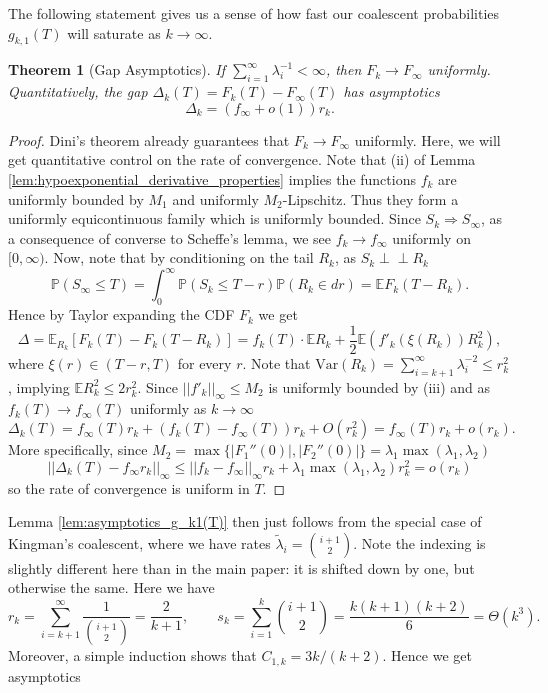 \documentclass[10pt,oneside,reqno]{article}
\theoremstyle{plain}
\newtheorem{theorem}{Theorem}[section]
\theoremstyle{definition}
\numberwithin{equation}{section}
\renewcommand{\cite}{\citep}
\renewcommand{\leq}{\leqslant}
\newcommand{\E}{\mathbb{E}}
\renewcommand{\P}{\mathbb{P}}
\newcommand{\indep}{\perp\!\!\!\perp}
\begin{document}
\noindent The following statement gives us a sense of how fast our coalescent probabilities $g_{k,1}(T)$ will saturate as $k \to \infty$.  

\begin{theorem}[Gap Asymptotics] If $\sum_{i=1}^\infty \lambda_i^{-1} < \infty$, then $F_k \to F_\infty$ uniformly. Quantitatively, the gap $\Delta_k(T) = F_{k}(T) - F_\infty(T)$ has asymptotics
        \[\Delta_k = (f_\infty + o(1))r_k.\] 
\end{theorem}

  \begin{proof}
          Dini's theorem already guarantees that $F_k \to F_\infty$ uniformly. Here, we will get quantitative control on the rate of convergence. Note that (ii) of Lemma \ref{lem:hypoexponential_derivative_properties} implies the functions $f_k$ are uniformly bounded by $M_1$ and uniformly $M_2$-Lipschitz. Thus they form a uniformly equicontinuous family which is uniformly bounded.  Since $S_k \Rightarrow S_\infty$, as a consequence of \cite{Boos1985ConverseScheffe} converse to Scheffe's lemma, we see $f_{k} \to f_{\infty}$ uniformly on $[0, \infty)$. Now, note that by conditioning on the tail $R_k$, as $S_k \indep R_k$
        \[\P(S_\infty \leq T) = \int_0^\infty \P(S_k \leq T-r) \P(R_k \in dr) = \E F_k(T-R_k).\]
        \noindent Hence by Taylor expanding the CDF $F_{k}$ we get
        \[\Delta = \E_{ R_k} [F_{k}(T) - F_{k}(T-R_k)] = f_{k}(T) \cdot \E R_k + \frac{1}{2}\E \left(f'_{k}(\xi(R_k)) R_k^2\right),\]
        \noindent where $\xi(r) \in (T-r, T)$ for every $r$. Note that $\mathrm{Var}(R_k) = \sum_{i=k+1}^\infty\lambda_i^{-2}\leq r_k^2$, implying $\E R_k^2 \leq 2r_k^2$. Since $||f'_{k}||_\infty \leq M_2$ is uniformly bounded by (iii) and as $f_{k}(T) \to f_{\infty}(T)$ uniformly as $k \to \infty$
        \[\Delta_k(T) = f_\infty(T) r_k + (f_k(T) - f_\infty(T))r_k + O(r_k^2) = f_\infty(T) r_k + o(r_k).\]
        \noindent More specifically, since $M_2 = \max \{|F_1''(0)|, |F_2''(0)|\} =  \lambda_1\max(\lambda_1, \lambda_2)$
        \[||\Delta_k(T) - f_\infty r_k||_\infty \leq ||f_k - f_\infty||_\infty r_k + \lambda_1\max(\lambda_1, \lambda_2) r_k^2 = o(r_k)\]
        \noindent so the rate of convergence is uniform in $T$.
  \end{proof}


  Lemma \ref{lem:asymptotics_g_k1(T)} then just follows from the special case of Kingman's coalescent, where we have rates $\tilde{\lambda}_i = {i+1 \choose 2}$. Note the indexing is slightly different here than in the main paper: it is shifted down by one, but otherwise the same. Here we have
%
\[r_k = \sum_{i=k+1}^\infty \frac{1}{{i +1 \choose 2}} = \frac{2}{k+1}, \qquad s_k = \sum_{i=1}^k {i + 1 \choose 2} =  \frac{k(k+1)(k+2)}{6} = \Theta(k^3).\]
%
\noindent Moreover, a simple induction shows that $C_{1,k} = 3k/(k+2)$. Hence we get asymptotics
\end{document}

